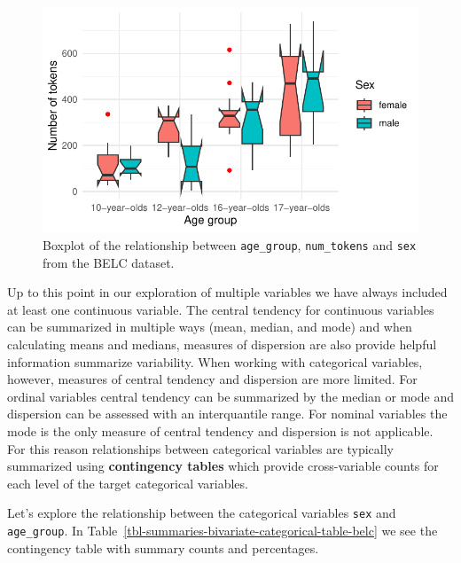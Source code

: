 \documentclass[
  letterpaper,
]{scrbook}
\begin{document}
\begin{figure}[h]

{\centering \includegraphics{./approaching-analysis_files/figure-pdf/fig-summaries-multivariate-boxplots-belc-1.pdf}

}

\caption{\label{fig-summaries-multivariate-boxplots-belc}Boxplot of the
relationship between \texttt{age\_group}, \texttt{num\_tokens} and
\texttt{sex} from the BELC dataset.}

\end{figure}

Up to this point in our exploration of multiple variables we have always
included at least one continuous variable. The central tendency for
continuous variables can be summarized in multiple ways (mean, median,
and mode) and when calculating means and medians, measures of dispersion
are also provide helpful information summarize variability. When working
with categorical variables, however, measures of central tendency and
dispersion are more limited. For ordinal variables central tendency can
be summarized by the median or mode and dispersion can be assessed with
an interquantile range. For nominal variables the mode is the only
measure of central tendency and dispersion is not applicable. For this
reason relationships between categorical variables are typically
summarized using \textbf{contingency tables} which provide
cross-variable counts for each level of the target categorical
variables.

Let's explore the relationship between the categorical variables
\texttt{sex} and \texttt{age\_group}. In
Table~\ref{tbl-summaries-bivariate-categorical-table-belc} we see the
contingency table with summary counts and percentages.
\end{document}
